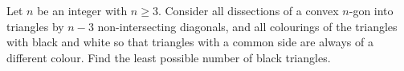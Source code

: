 Let $n$ be an integer with $n\ge 3$. Consider all dissections of a convex $n$-gon into triangles by $n-3$ non-intersecting diagonals, and all colourings of the triangles with black and white so that triangles with a common side are always of a different colour. Find the least possible number of black triangles.